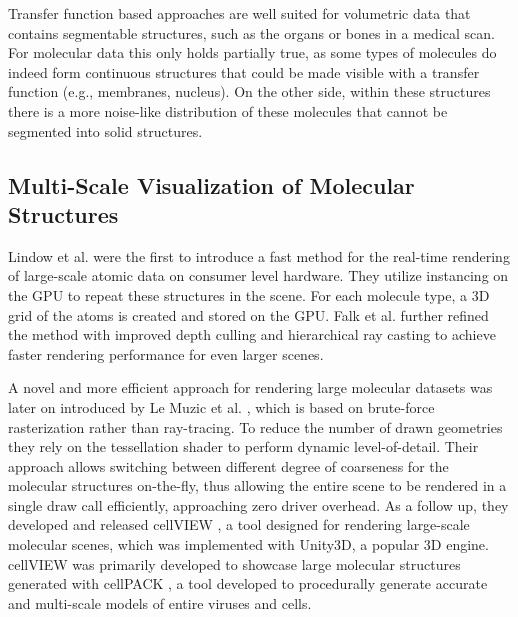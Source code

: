 \pagebreak

Transfer function based approaches are well suited for volumetric data that contains segmentable structures, such as the organs or bones in a medical scan. For molecular data this only holds partially true, as some types of molecules do indeed form continuous structures that could be made visible with a transfer function (e.g., membranes, nucleus). On the other side, within these structures there is a more noise-like distribution of these molecules that cannot be segmented into solid structures.

\subsection{Multi-Scale Visualization of Molecular Structures}
Lindow et al. \cite{lindow15} were the first to introduce a fast method for the real-time rendering of large-scale atomic data on consumer level hardware. They utilize instancing on the GPU to repeat these structures in the scene. For each molecule type, a 3D grid of the atoms is created and stored on the GPU. Falk et al. \cite{falk13} further refined the method with improved depth culling and hierarchical ray casting to achieve faster rendering performance for even larger scenes. 

A novel and more efficient approach for rendering large molecular datasets was later on introduced by Le Muzic et al. \cite{le2014illustrative}, which is based on brute-force rasterization rather than ray-tracing. 
To reduce the number of drawn geometries they rely on the tessellation shader to perform dynamic level-of-detail. 
Their approach allows switching between different degree of coarseness for the molecular structures on-the-fly, thus allowing the entire scene to be rendered in a single draw call efficiently, approaching zero driver overhead. 
As a follow up, they developed and released cellVIEW \cite{muzic15}, a tool designed for rendering large-scale molecular scenes, which was implemented with Unity3D, a popular 3D engine.
cellVIEW was primarily developed to showcase large molecular structures generated with cellPACK \cite{cellpack}, a tool developed to procedurally generate accurate and multi-scale models of entire viruses and cells.

